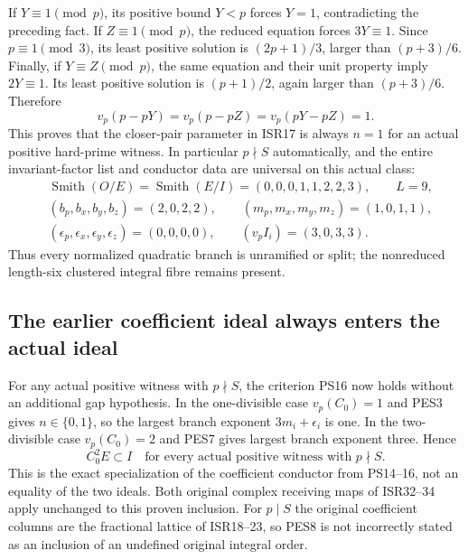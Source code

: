 \documentclass[11pt]{article}
\begin{document}
If $Y\equiv1\pmod p$, its positive bound $Y<p$ forces $Y=1$,
contradicting the preceding fact. If $Z\equiv1\pmod p$, the reduced
equation forces $3Y\equiv1$. Since $p\equiv1\pmod3$, its least
positive solution is $(2p+1)/3$, larger than $(p+3)/6$.
Finally, if $Y\equiv Z\pmod p$, the same equation and their unit
property imply $2Y\equiv1$. Its least positive solution is
$(p+1)/2$, again larger than $(p+3)/6$. Therefore
\begin{equation}
 v_p(p-pY)=v_p(p-pZ)=v_p(pY-pZ)=1.                       \tag{PES6}
\end{equation}
This proves that the closer-pair parameter in ISR17 is always $n=1$
for an actual positive hard-prime witness. In particular $p\nmid S$
automatically, and the entire invariant-factor list and conductor data
are universal on this actual class:
\begin{equation}
 \begin{aligned}
 &\operatorname{Smith}(O/E)=\operatorname{Smith}(E/I)
       =(0,0,0,1,1,2,2,3),\qquad L=9,\\
 &(b_p,b_x,b_y,b_z)=(2,0,2,2),\qquad
 (m_p,m_x,m_y,m_z)=(1,0,1,1),\\
 &(\epsilon_p,\epsilon_x,\epsilon_y,\epsilon_z)=(0,0,0,0),
 \qquad (v_p I_i)=(3,0,3,3).
 \end{aligned}                                         \tag{PES7}
\end{equation}
Thus every normalized quadratic branch is unramified or split; the
nonreduced length-six clustered integral fibre remains present.

\subsection{The earlier coefficient ideal always enters the actual ideal}
For any actual positive witness with $p\nmid S$, the criterion PS16
now holds without an additional gap hypothesis. In the one-divisible
case $v_p(C_0)=1$ and PES3 gives $n\in\{0,1\}$, so the largest
branch exponent $3m_i+\epsilon_i$ is one. In the two-divisible case
$v_p(C_0)=2$ and PES7 gives largest branch exponent three. Hence
\begin{equation}
 C_0^2 E\subset I
 \quad\text{for every actual positive witness with }p\nmid S.
                                                               \tag{PES8}
\end{equation}
This is the exact specialization of the coefficient conductor
from PS14--16, not an equality of the two ideals. Both original
complex receiving maps of ISR32--34 apply unchanged to this proven
inclusion. For $p\mid S$ the original coefficient columns are the
fractional lattice of ISR18--23, so PES8 is not incorrectly stated
as an inclusion of an undefined original integral order.
\end{document}
